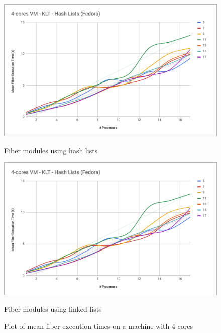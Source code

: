 \documentclass[a4paper,10pt]{article}
\begin{document}
 \begin{figure}[ht!]
   \centering
   \begin{minipage}{0.45\textwidth}%
     \centering
     \includegraphics[width=\textwidth]{imgs/bench-4cores-hash}
     \caption{Fiber modules using hash lists}
     \label{fig:2figsA}
   \end{minipage}%
   \qquad
   \begin{minipage}{0.45\textwidth}%
     \centering
     \includegraphics[width=\textwidth]{imgs/bench-4cores-hash}
     \caption{Fiber modules using linked lists}
     \label{fig:2figsB}%
   \end{minipage}%
   \caption{Plot of mean fiber execution times on a machine with 4 cores}
 \end{figure}
\end{document}
